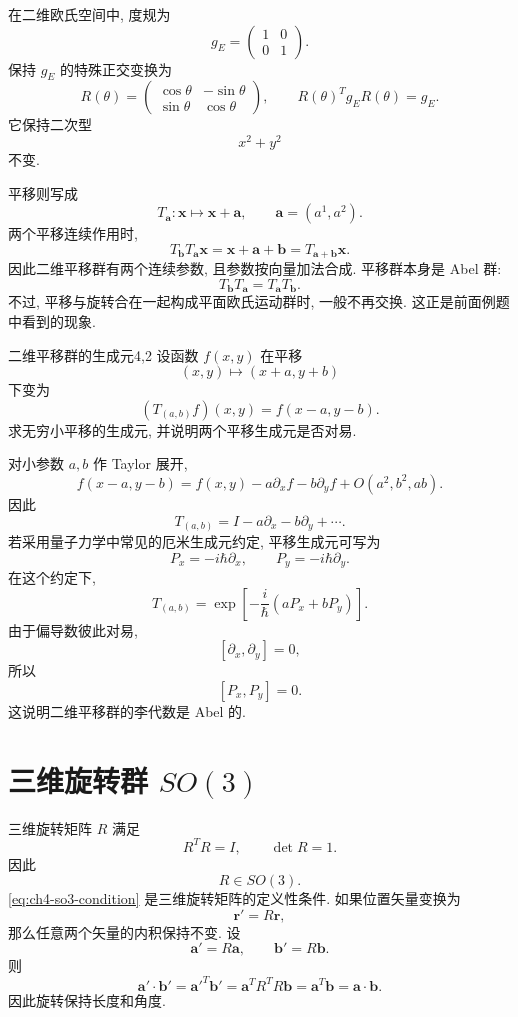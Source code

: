 在二维欧氏空间中, 度规为
\[
g_E=
\begin{pmatrix}
1&0\\
0&1
\end{pmatrix}.
\]
保持 $g_E$ 的特殊正交变换为
\[
R(\theta)
=
\begin{pmatrix}
\cos\theta&-\sin\theta\\
\sin\theta&\cos\theta
\end{pmatrix},
\qquad
R(\theta)^Tg_ER(\theta)=g_E.
\]
它保持二次型
\[
x^2+y^2
\]
不变. 

平移则写成
\[
T_{\bm{a}}:\bm{x}\mapsto \bm{x}+\bm{a},
\qquad
\bm{a}=(a^1,a^2).
\]
两个平移连续作用时,
\[
T_{\bm{b}}T_{\bm{a}}\bm{x}
=
\bm{x}+\bm{a}+\bm{b}
=
T_{\bm{a}+\bm{b}}\bm{x}.
\]
因此二维平移群有两个连续参数, 且参数按向量加法合成. 平移群本身是 Abel 群:
\[
T_{\bm{b}}T_{\bm{a}}
=
T_{\bm{a}}T_{\bm{b}}.
\]
不过, 平移与旋转合在一起构成平面欧氏运动群时, 一般不再交换. 这正是前面例题中看到的现象. 

\begin{example}{二维平移群的生成元}{4,2}
设函数 $f(x,y)$ 在平移
\[
(x,y)\mapsto (x+a,y+b)
\]
下变为
\[
(T_{(a,b)}f)(x,y)=f(x-a,y-b).
\]
求无穷小平移的生成元, 并说明两个平移生成元是否对易. 
\begin{solution}
对小参数 $a,b$ 作 Taylor 展开,
\[
f(x-a,y-b)
=
f(x,y)-a\partial_x f-b\partial_y f+O(a^2,b^2,ab).
\]
因此
\[
T_{(a,b)}
=
I-a\partial_x-b\partial_y+\cdots.
\]
若采用量子力学中常见的厄米生成元约定, 平移生成元可写为
\[
P_x=-i\hbar\partial_x,
\qquad
P_y=-i\hbar\partial_y.
\]
在这个约定下,
\[
T_{(a,b)}
=
\exp\left[
-\frac{i}{\hbar}(aP_x+bP_y)
\right].
\]
由于偏导数彼此对易,
\[
[\partial_x,\partial_y]=0,
\]
所以
\[
[P_x,P_y]=0.
\]
这说明二维平移群的李代数是 Abel 的. 
\end{solution}
\end{example}

\section{\texorpdfstring{三维旋转群 $SO(3)$}{三维旋转群 SO(3)}}

三维旋转矩阵 $R$ 满足
\begin{equation}
\label{eq:ch4-so3-condition}
R^TR=I,
\qquad
\det R=1.
\end{equation}
因此
\[
R\in SO(3).
\]
\eqref{eq:ch4-so3-condition} 是三维旋转矩阵的定义性条件. 如果位置矢量变换为
\[
\bm{r}'=R\bm{r},
\]
那么任意两个矢量的内积保持不变. 设
\[
\bm{a}'=R\bm{a},
\qquad
\bm{b}'=R\bm{b}.
\]
则
\[
\bm{a}'\cdot\bm{b}'
=
\bm{a}'^T\bm{b}'
=
\bm{a}^TR^TR\bm{b}
=
\bm{a}^T\bm{b}
=
\bm{a}\cdot\bm{b}.
\]
因此旋转保持长度和角度. 

